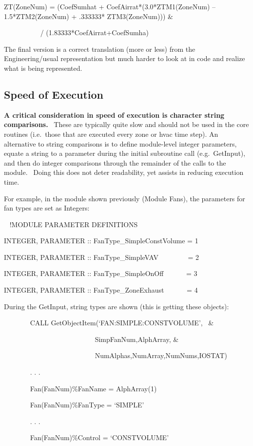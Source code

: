 ZT(ZoneNum) = (CoefSumhat + CoefAirrat*(3.0*ZTM1(ZoneNum) -- 1.5*ZTM2(ZoneNum) + .333333* ZTM3(ZoneNum))) \&

~~~~~~~~~~ / (1.83333*CoefAirrat+CoefSumha)

The final version is a correct translation (more or less) from the Engineering/usual representation but much harder to look at in code and realize what is being represented.

\subsection{Speed of Execution}\label{speed-of-execution}

\textbf{A critical consideration in speed of execution is character string comparisons.}~ These are typically quite slow and should not be used in the core routines (i.e.~those that are executed every zone or hvac time step). An alternative to string comparisons is to define module-level integer parameters, equate a string to a parameter during the initial subroutine call (e.g.~GetInput), and then do integer comparisons through the remainder of the calls to the module.~ Doing this does not deter readability, yet assists in reducing execution time.

For example, in the module shown previously (Module Fans), the parameters for fan types are set as Integers:

~ !MODULE PARAMETER DEFINITIONS

INTEGER, PARAMETER :: FanType\_SimpleConstVolume = 1

INTEGER, PARAMETER :: FanType\_SimpleVAV~~~~~~~~ = 2

INTEGER, PARAMETER :: FanType\_SimpleOnOff~~~~~~ = 3

INTEGER, PARAMETER :: FanType\_ZoneExhaust~~~~~~ = 4

During the GetInput, string types are shown (this is getting these objects):

~~~~~~~ CALL GetObjectItem(`FAN:SIMPLE:CONSTVOLUME',~ \&

~~~~~~~~~~~~~~~~~~~~~~~~~~ SimpFanNum,AlphArray, \&

~~~~~~~~~~~~~~~~~~~~~~~~ ~~NumAlphas,NumArray,NumNums,IOSTAT)

~~~~~~~ . . .

~~~~~~~ Fan(FanNum)\%FanName = AlphArray(1)

~~~~~~~ Fan(FanNum)\%FanType = `SIMPLE'

~~~~~~~ . . .

~~~~~~~ Fan(FanNum)\%Control = `CONSTVOLUME'

